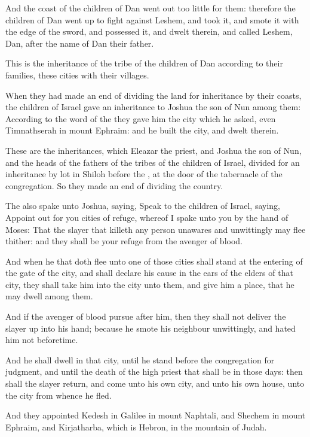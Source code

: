 \Verse And the coast of the children of Dan went out too little for them: therefore the children of Dan went up to fight against Leshem, and took it, and smote it with the edge of the sword, and possessed it, and dwelt therein, and called Leshem, Dan, after the name of Dan their father.

\Verse This is the inheritance of the tribe of the children of Dan according to their families, these cities with their villages.

\Verse When they had made an end of dividing the land for inheritance by their coasts, the children of Israel gave an inheritance to Joshua the son of Nun among them: \Verse According to the word of the \LORD they gave him the city which he asked, even Timnathserah in mount Ephraim: and he built the city, and dwelt therein.

\Verse These are the inheritances, which Eleazar the priest, and Joshua the son of Nun, and the heads of the fathers of the tribes of the children of Israel, divided for an inheritance by lot in Shiloh before the \LORD, at the door of the tabernacle of the congregation. So they made an end of dividing the country.


\Chapter
\Verse The \LORD also spake unto Joshua, saying, \Verse Speak to the children of Israel, saying, Appoint out for you cities of refuge, whereof I spake unto you by the hand of Moses: \Verse That the slayer that killeth any person unawares and unwittingly may flee thither: and they shall be your refuge from the avenger of blood.

\Verse And when he that doth flee unto one of those cities shall stand at the entering of the gate of the city, and shall declare his cause in the ears of the elders of that city, they shall take him into the city unto them, and give him a place, that he may dwell among them.

\Verse And if the avenger of blood pursue after him, then they shall not deliver the slayer up into his hand; because he smote his neighbour unwittingly, and hated him not beforetime.

\Verse And he shall dwell in that city, until he stand before the congregation for judgment, and until the death of the high priest that shall be in those days: then shall the slayer return, and come unto his own city, and unto his own house, unto the city from whence he fled.

\Verse And they appointed Kedesh in Galilee in mount Naphtali, and Shechem in mount Ephraim, and Kirjatharba, which is Hebron, in the mountain of Judah.

